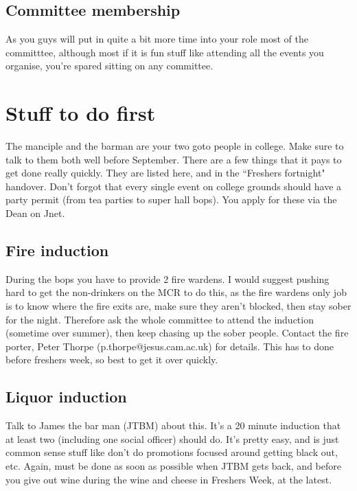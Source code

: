 \documentclass[9.5pt]{article} %
\begin{document}
\subsection{Committee membership} %
As you guys will put in quite a bit more time into your role most of the committtee, although most if it is fun stuff like attending all the events you organise, you're spared sitting on any committee.

\section{Stuff to do first} %
The manciple and the barman are your two goto people in college. Make sure to talk to them both well before September.
There are a few things that it pays to get done really quickly. They are listed here, and in the ``Freshers fortnight" handover.
Don't forgot that every single event on college grounds should have a party permit (from tea parties to super hall bops). You apply for these via the Dean on Jnet.



\subsection{Fire induction} %

During the bops you have to provide 2 fire wardens. I would suggest pushing hard to get the non-drinkers on the MCR to do this, as the fire wardens only job is to know where the fire exits are, make sure they aren't blocked, then stay sober for the night. Therefore ask the whole committee to attend the induction (sometime over summer), then keep chasing up the sober people. Contact the fire porter, Peter Thorpe (p.thorpe@jesus.cam.ac.uk) for details. This has to done before freshers week, so best to get it over quickly. 


\subsection{Liquor induction} %

Talk to James the bar man (JTBM) about this. It's a 20 minute induction that at least two (including one social officer) should do. It's pretty easy, and is just common sense stuff like don't do promotions focused around getting black out, etc. Again, must be done as soon as possible when JTBM gets back, and before you give out wine during the wine and cheese in Freshers Week, at the latest.
\end{document}
